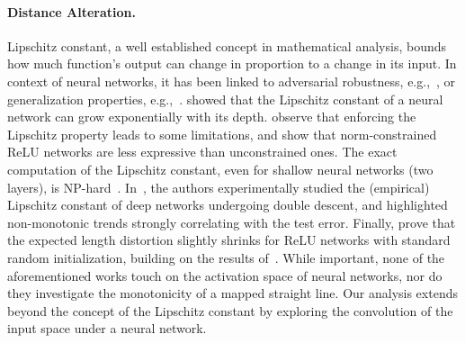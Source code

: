 \paragraph{Distance Alteration.}
Lipschitz constant, a well established concept in mathematical analysis,  bounds  how much function's output can change in proportion to a change in its input. 
In context of neural networks, it has been linked to adversarial robustness, e.g.,~\citep{tsuzuku2018lipschitz,virmaux2018lipschitz}, or generalization properties, e.g.,~\citep{bonicelli2022effectiveness}. \citeauthor{cisse2017parseval} showed that the Lipschitz constant of a neural network can grow exponentially with its depth.
\citeauthor{cem2019sortinglipschitzapproximation} observe  that enforcing the Lipschitz property leads to some limitations, and show that   norm-constrained
ReLU networks are less expressive than unconstrained ones.  The exact computation of the Lipschitz constant, even for shallow neural networks (two layers), is NP-hard~\citep{virmaux2018lipschitz}. In~\cite{gamba2023lipschitz}, the authors experimentally studied  the (empirical) Lipschitz constant of deep networks undergoing double descent, and highlighted non-monotonic trends strongly correlating with the test error.
Finally, \citeauthor{hanin2021deep} prove that the expected length distortion slightly shrinks  for ReLU networks with standard random
initialization, building on the results of~\citeauthor{Ilan2021Trajectorygrowth}.
While important, none of the aforementioned works touch on the activation space of neural networks, nor do they investigate the monotonicity of a mapped straight line. Our analysis extends beyond the concept of the Lipschitz constant by exploring the convolution of the input space under a neural network.